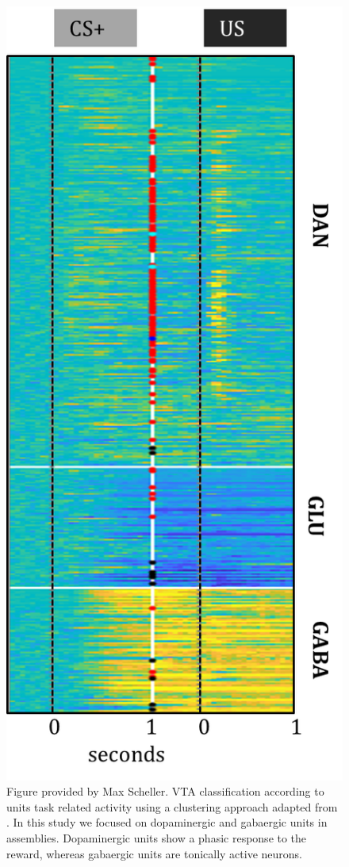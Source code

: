 \begin{figure}[H]
  \centering
    \includegraphics[scale=0.5]{figures/ClassificationUnits.png}
   \caption{Figure provided by Max Scheller. VTA classification according to units task related activity using a clustering approach adapted from \cite{Uchida}. In this study we focused on dopaminergic and gabaergic units in assemblies. Dopaminergic units show a phasic response to the reward, whereas gabaergic units are tonically active neurons.}
    \label{fig:ClassificatonVTA}
\end{figure}
